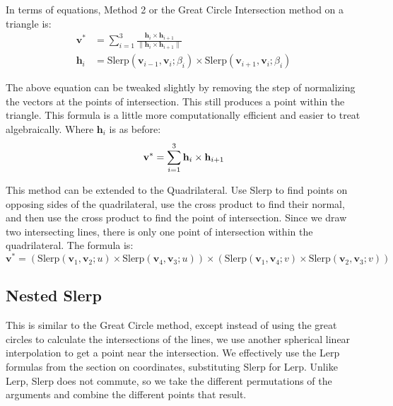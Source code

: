 \documentclass{amsart}[12pt]
\begin{document}
In terms of equations, Method 2 or the Great Circle Intersection
method on a triangle is:
\begin{equation}\begin{split}%
\mathbf v^* & = \sum^3_{i=1} \frac{\mathbf h_i \times \mathbf h_{i+1}}
{\|\mathbf h_i \times \mathbf h_{i+1}\|} \\
\mathbf h_i & =
\mathrm{Slerp}(\mathbf v_{i-1}, \mathbf v_i; \beta_{i})
\times
\mathrm{Slerp}(\mathbf v_{i+1}, \mathbf v_i; \beta_{i})
\end{split}\end{equation}

The above equation can be tweaked slightly by removing the step of normalizing
the vectors at the points of intersection. This still produces a point within
the triangle. This formula is a little more computationally efficient and
easier to treat algebraically. Where $\mathbf h_i$ is as before:
\begin{equation}\label{eq:gct}%
\mathbf v^* = \sum^3_{i=1} \mathbf h_i \times \mathbf h_{i+1} \\
\end{equation}

This method can be extended to the Quadrilateral. Use Slerp to find points on
opposing sides of the quadrilateral, use the cross product to find their
normal, and then use the cross product to find the point of intersection. Since
we draw two intersecting lines, there is only one point of intersection within
the quadrilateral. The formula is:
\begin{equation}\label{eq:gcq}%
\mathbf v^* =
(\mathrm{Slerp}(\mathbf v_1, \mathbf v_2; u)
\times
\mathrm{Slerp}(\mathbf v_4, \mathbf v_3; u))
\times
(\mathrm{Slerp}(\mathbf v_1, \mathbf v_4; v)
\times
\mathrm{Slerp}(\mathbf v_2, \mathbf v_3; v))
\end{equation}

\subsection{Nested Slerp}
This is similar to the Great Circle method, except instead of using the great
circles to calculate the intersections of the lines, we use another spherical
linear interpolation to get a point near the intersection. We effectively use
the Lerp formulas from the section on coordinates, substituting Slerp for Lerp.
Unlike Lerp, Slerp does not commute, so we take the different permutations of
the arguments and combine the different points that result.
\end{document}
